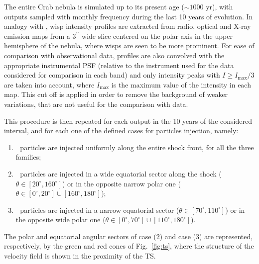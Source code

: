 The entire Crab nebula is simulated up to its present age ($\sim 1000$ yr), with outputs sampled with monthly frequency during the last 10 years of evolution. 
In analogy with \citet{Schweizer:2013}, wisp intensity profiles are extracted from radio, optical and X-ray emission maps from a $3^{\prime\prime}$ wide slice centered on the polar axis in the upper hemisphere of the nebula, where wisps are seen to be more prominent.
For ease of comparison with observational data, profiles are also convolved with the appropriate instrumental PSF (relative to the instrument used for the data considered for comparison in each band) and only intensity peaks with $I\geq I_\mathrm{max}/3$ are taken into account, where $I_\mathrm{max}$ is the maximum value of the intensity in each map. 
This cut off is applied in order to remove the background of weaker variations, that are not useful for the comparison with data. 

This procedure is then repeated for each output in the 10 years of the considered interval, and for each one of the defined cases for particles injection, namely:
\begin{enumerate}[(1)]
	\item  $\;$ particles are injected uniformly along the entire shock front, for all the three families;
	\item  $\;$ particles are injected in a wide equatorial sector along the shock ($\theta \in \left[ 20^\circ, 160^\circ \right]$) or in the opposite narrow polar one ($\theta \in \left[ 0^\circ, 20^\circ \right]\cup\left[ 160^\circ, 180^\circ \right]$);
	\item  $\;$ particles are injected in a narrow equatorial sector ($\theta \in \left[ 70^\circ, 110^\circ \right]$) or in the opposite wide polar one ($\theta \in \left[ 0^\circ, 70^\circ \right]\cup\left[ 110^\circ, 180^\circ \right]$).
\end{enumerate}

The polar and equatorial angular sectors of case (2) and case (3) are represented, respectively, by the green and red cones of Fig.~\ref{fig:ts}, where the structure of the velocity field is shown in the proximity of the TS.


